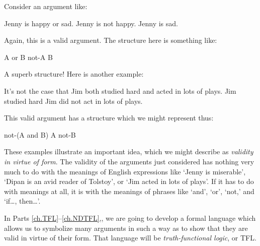  Consider an argument like:
	\begin{earg}
		\prem Jenny is  happy or sad.
		\prem Jenny is not happy.
		\conc Jenny is sad.
	\end{earg}
Again, this is a valid argument. The structure here is something like:
	\begin{earg}
		\prem A or B
		\prem not-A
		\conc B
	\end{earg}
A superb structure! Here is another example:
	\begin{earg}
		\prem It's not the case that Jim both studied hard and acted in lots of plays.
		\prem Jim studied hard
		\conc Jim did not act in lots of plays.
	\end{earg}
This valid argument has a structure which we might represent thus:
	\begin{earg}
		\prem not-(A and B)
		\prem A
		\conc not-B
	\end{earg}
These examples illustrate an important idea, which we might describe as \emph{validity in virtue of form}. The validity of the arguments just considered has nothing very much to do with the meanings of English expressions like `Jenny is miserable', `Dipan is an avid reader of Tolstoy', or `Jim acted in lots of plays'. If it has to do with meanings at all, it is with the meanings of phrases like `and', `or', `not,' and `if\ldots, then\ldots'. 

In Parts \ref{ch.TFL}--\ref{ch.NDTFL},, we are going to develop a formal language which allows us to symbolize many arguments in such a way as to show that they are valid in virtue of their form. That language will be \emph{truth-functional logic}, or TFL.






